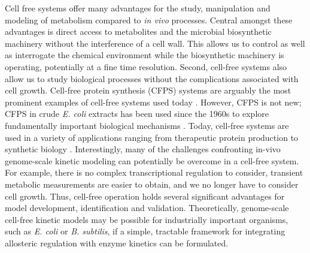 \documentclass[12pt]{article}
\begin{document}
Cell free systems offer many advantages for the study, manipulation and modeling of metabolism compared to \textit{in vivo} processes.
Central amongst these advantages is direct access to metabolites and the microbial biosynthetic machinery without the interference of a cell wall.
This allows us to control as well as interrogate the chemical environment while the biosynthetic machinery is operating, potentially at a fine time resolution.
Second, cell-free systems also allow us to study biological processes without the complications associated with cell growth.
Cell-free protein synthesis (CFPS) systems are arguably the most prominent examples of cell-free systems used today \citep{Jewett:2008aa}.
However, CFPS is not new; CFPS in crude \textit{E. coli} extracts has been used since the 1960s to explore fundamentally important biological mechanisms \citep{MATTHAEI:1961aa,NIRENBERG:1961aa}.
Today, cell-free systems are used in a variety of applications ranging from therapeutic protein production \citep{Lu:2014aa} to synthetic biology \citep{Hodgman:2012aa}.
Interestingly, many of the challenges confronting in-vivo genome-scale kinetic modeling can potentially be overcome in a cell-free system.
For example, there is no complex transcriptional regulation to consider, transient metabolic measurements are easier to obtain, and we no longer have to consider cell growth.
Thus, cell-free operation holds several significant advantages for model development, identification and validation.
Theoretically, genome-scale cell-free kinetic models may be possible for industrially important organisms, such as \textit{E. coli} or \textit{B. subtilis}, if a simple, tractable framework for integrating allosteric regulation with enzyme kinetics can be formulated.
\end{document}
